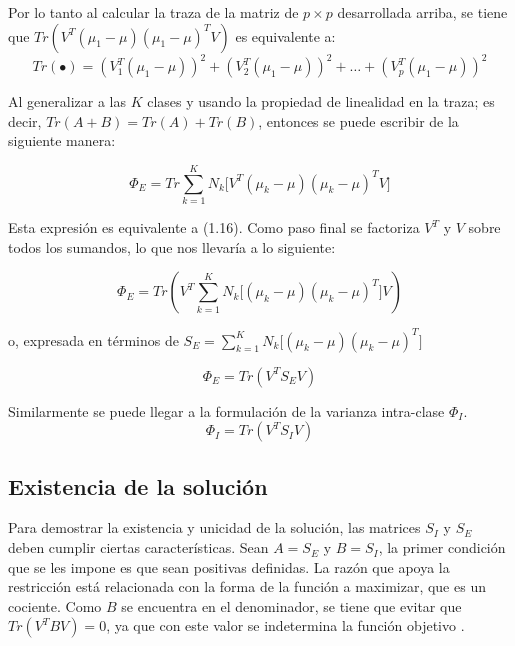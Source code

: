 \vspace{5mm}

 Por lo tanto al calcular la traza de la matriz de $p \times p$ desarrollada arriba, se tiene que $Tr(V^T (\mu_1 - \mu) (\mu_1 - \mu)^T V)$ es equivalente a:
 \vspace{3mm}
 \begin{equation*}
Tr(\bullet) = (V_1^T (\mu_1-\mu))^2+ (V_2^T (\mu_1-\mu) )^2 + \hdots + (V_p^T (\mu_1-\mu) )^2
 \end{equation*}

Al generalizar a las $K$ clases y usando la propiedad de linealidad en la traza; es decir, $Tr(A+B) = Tr(A)+Tr(B)$, entonces se puede escribir de la siguiente manera:

\begin{equation*}
\Phi_E = Tr \sum\limits_{k = 1}^{K} N_{k}  \big[ V^T (\mu_k - \mu) (\mu_k - \mu)^T V \big]
\end{equation*}


Esta expresión es equivalente a (1.16). Como paso final se factoriza $V^T$ y $V$ sobre todos los sumandos, lo que nos llevaría a lo siguiente:

\begin{equation*} 
\Phi_E =  Tr (V^T \sum\limits_{k = 1}^{K} N_{k}  \big[(\mu_k - \mu) (\mu_k - \mu)^T \big] V)   
\end{equation*}

o, expresada en términos de $S_E = \sum\limits_{k = 1}^{K} N_{k}  \big[(\mu_k - \mu) (\mu_k - \mu)^T \big]$

\begin{equation}\label{eq:2.19}
\Phi_E =  Tr (V^T S_E V)     
\end{equation}

Similarmente se puede llegar a la formulación de la varianza intra-clase $\Phi_{I}$.
\begin{equation}\label{eq:2.20}
\Phi_{I} =  Tr (V^T S_I V )
\end{equation}



\subsection{Existencia de la solución}

Para demostrar la existencia y unicidad de la solución, las matrices $S_I$ y $S_E$ deben cumplir ciertas características. Sean $A = S_E$ y $B = S_I$, la primer condición que se les impone es que sean positivas definidas. La razón que apoya la restricción está relacionada con la forma de la función a maximizar, que es un cociente. Como $B$ se encuentra en el denominador, se tiene que evitar que $Tr(V^T B V) = 0$, ya que con este valor se indetermina la función objetivo \cite{ngo2012trace}. 

